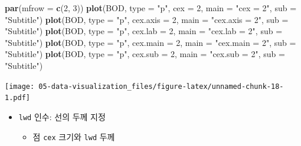 \documentclass[
  11pt,
]{krantz}
\newenvironment{Shaded}{\begin{snugshade}}{\end{snugshade}}
\newcommand{\DataTypeTok}[1]{\textcolor[rgb]{0.27,0.27,0.27}{#1}}
\newcommand{\DecValTok}[1]{\textcolor[rgb]{0.06,0.06,0.06}{#1}}
\newcommand{\KeywordTok}[1]{\textcolor[rgb]{0.27,0.27,0.27}{\textbf{#1}}}
\newcommand{\NormalTok}[1]{#1}
\newcommand{\StringTok}[1]{\textcolor[rgb]{0.5,0.5,0.5}{#1}}
\providecommand{\tightlist}{%
  \setlength{\itemsep}{0pt}\setlength{\parskip}{0pt}}
\begin{document}
\begin{Shaded}
\begin{Highlighting}[]
\KeywordTok{par}\NormalTok{(}\DataTypeTok{mfrow =} \KeywordTok{c}\NormalTok{(}\DecValTok{2}\NormalTok{, }\DecValTok{3}\NormalTok{))}
\KeywordTok{plot}\NormalTok{(BOD, }\DataTypeTok{type =} \StringTok{"p"}\NormalTok{, }\DataTypeTok{cex =} \DecValTok{2}\NormalTok{, }
     \DataTypeTok{main =} \StringTok{"cex = 2"}\NormalTok{, }
     \DataTypeTok{sub =} \StringTok{"Subtitle"}\NormalTok{)}
\KeywordTok{plot}\NormalTok{(BOD, }\DataTypeTok{type =} \StringTok{"p"}\NormalTok{, }
     \DataTypeTok{cex.axis =} \DecValTok{2}\NormalTok{, }
     \DataTypeTok{main =} \StringTok{"cex.axis = 2"}\NormalTok{, }
     \DataTypeTok{sub =} \StringTok{"Subtitle"}\NormalTok{)}
\KeywordTok{plot}\NormalTok{(BOD, }\DataTypeTok{type =} \StringTok{"p"}\NormalTok{, }
     \DataTypeTok{cex.lab =} \DecValTok{2}\NormalTok{, }
     \DataTypeTok{main =} \StringTok{"cex.lab = 2"}\NormalTok{, }
     \DataTypeTok{sub =} \StringTok{"Subtitle"}\NormalTok{)}
\KeywordTok{plot}\NormalTok{(BOD, }\DataTypeTok{type =} \StringTok{"p"}\NormalTok{, }
     \DataTypeTok{cex.main =} \DecValTok{2}\NormalTok{, }
     \DataTypeTok{main =} \StringTok{"cex.main = 2"}\NormalTok{, }
     \DataTypeTok{sub =} \StringTok{"Subtitle"}\NormalTok{)}
\KeywordTok{plot}\NormalTok{(BOD, }\DataTypeTok{type =} \StringTok{"p"}\NormalTok{,}
     \DataTypeTok{cex.sub =} \DecValTok{2}\NormalTok{, }
     \DataTypeTok{main =} \StringTok{"cex.sub = 2"}\NormalTok{, }
     \DataTypeTok{sub =} \StringTok{"Subtitle"}\NormalTok{)}
\end{Highlighting}
\end{Shaded}

\texttt{[image: 05-data-visualization\_files/figure-latex/unnamed-chunk-18-1.pdf]}

\normalsize

\begin{itemize}
\tightlist
\item
  \texttt{lwd} 인수: 선의 두께 지정

  \begin{itemize}
  \tightlist
  \item
    점 \texttt{cex} 크기와 \texttt{lwd} 두께
  \end{itemize}
\end{itemize}

\footnotesize
\end{document}
